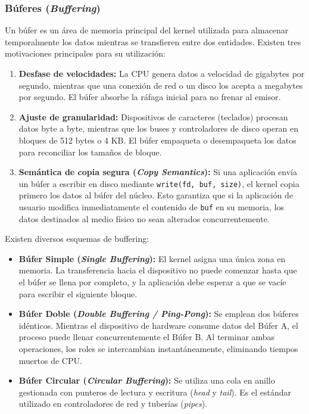 \documentclass[11pt,letterpaper]{article}
\begin{document}
\subsubsection{Búferes (\textit{Buffering})}
Un búfer es un área de memoria principal del kernel utilizada para almacenar temporalmente los datos mientras se transfieren entre dos entidades. Existen tres motivaciones principales para su utilización:
\begin{enumerate}
    \item \textbf{Desfase de velocidades:} La CPU genera datos a velocidad de gigabytes por segundo, mientras que una conexión de red o un disco los acepta a megabytes por segundo. El búfer absorbe la ráfaga inicial para no frenar al emisor.
    \item \textbf{Ajuste de granularidad:} Dispositivos de caracteres (teclados) procesan datos byte a byte, mientras que los buses y controladores de disco operan en bloques de 512 bytes o 4 KB. El búfer empaqueta o desempaqueta los datos para reconciliar los tamaños de bloque.
    \item \textbf{Semántica de copia segura (\textit{Copy Semantics}):} Si una aplicación envía un búfer a escribir en disco mediante \texttt{write(fd, buf, size)}, el kernel copia primero los datos al búfer del núcleo. Esto garantiza que si la aplicación de usuario modifica inmediatamente el contenido de \texttt{buf} en su memoria, los datos destinados al medio físico no sean alterados concurrentemente.
\end{enumerate}

Existen diversos esquemas de buffering:
\begin{itemize}
    \item \textbf{Búfer Simple (\textit{Single Buffering}):} El kernel asigna una única zona en memoria. La transferencia hacia el dispositivo no puede comenzar hasta que el búfer se llena por completo, y la aplicación debe esperar a que se vacíe para escribir el siguiente bloque.
    \item \textbf{Búfer Doble (\textit{Double Buffering / Ping-Pong}):} Se emplean dos búferes idénticos. Mientras el dispositivo de hardware consume datos del Búfer A, el proceso puede llenar concurrentemente el Búfer B. Al terminar ambas operaciones, los roles se intercambian instantáneamente, eliminando tiempos muertos de CPU.
    \item \textbf{Búfer Circular (\textit{Circular Buffering}):} Se utiliza una cola en anillo gestionada con punteros de lectura y escritura (\textit{head} y \textit{tail}). Es el estándar utilizado en controladores de red y tuberías (\textit{pipes}).
\end{itemize}
\end{document}
